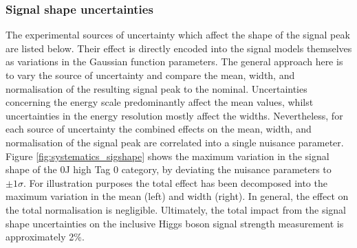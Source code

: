 \subsubsection{Signal shape uncertainties}
The experimental sources of uncertainty which affect the shape of the signal \mgg peak are listed below. Their effect is directly encoded into the signal models themselves as variations in the Gaussian function parameters. The general approach here is to vary the source of uncertainty and compare the mean, width, and normalisation of the resulting signal \mgg peak to the nominal. Uncertainties concerning the energy scale predominantly affect the mean values, whilst uncertainties in the energy resolution mostly affect the widths. Nevertheless, for each source of uncertainty the combined effects on the mean, width, and normalisation of the signal peak are correlated into a single nuisance parameter. Figure \ref{fig:systematics_sigshape} shows the maximum variation in the signal shape of the 0J high \ptgg Tag 0 category, by deviating the nuisance parameters to $\pm 1\sigma$. For illustration purposes the total effect has been decomposed into the maximum variation in the mean (left) and width (right). In general, the effect on the total normalisation is negligible. Ultimately, the total impact from the signal shape uncertainties on the inclusive Higgs boson signal strength measurement is approximately 2\%.

